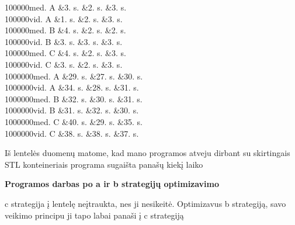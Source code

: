 \begin{DoxyItemize}
\begin{longtabu}
100000med. A  &3. s.  &2. s.  &3. s.   \\
100000vid. A  &1. s.  &2. s.  &3. s.   \\
100000med. B  &4. s.  &2. s.  &2. s.   \\
100000vid. B  &3. s.  &3. s.  &3. s.   \\
100000med. C  &4. s.  &2. s.  &3. s.   \\
100000vid. C  &3. s.  &2. s.  &3. s.   \\
1000000med. A  &29. s.  &27. s.  &30. s.   \\
1000000vid. A  &34. s.  &28. s.  &31. s.   \\
1000000med. B  &32. s.  &30. s.  &31. s.   \\
1000000vid. B  &31. s.  &32. s.  &30. s.   \\
1000000med. C  &40. s.  &29. s.  &35. s.   \\
1000000vid. C  &38. s.  &38. s.  &37. s.   \\
\end{longtabu}

\item Iš lentelės duomenų matome, kad mano programos atveju dirbant su skirtingais S\+TL konteineriais programa sugaišta panašų kiekį laiko
\end{DoxyItemize}

{\bfseries{Programos darbas po a ir b strategijų optimizavimo}}
\begin{DoxyItemize}
\item {\ttfamily c} strategija į lentelę neįtraukta, nes ji nesikeitė. Optimizavus {\ttfamily b} strategiją, savo veikimo principu ji tapo labai panaši į {\ttfamily c} strategiją
\end{DoxyItemize}


\begin{DoxyCode}{0}
\DoxyCodeLine{}
\end{DoxyCode}

